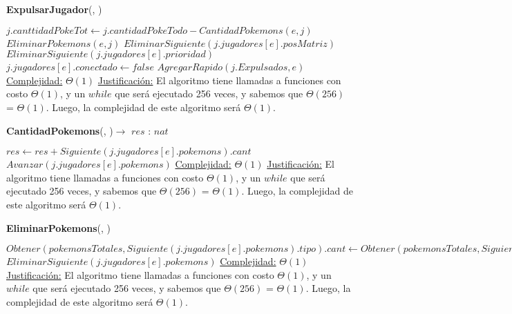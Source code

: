 \begin{algorithm}[H]{\textbf{ExpulsarJugador}(, )}   
    \begin{algorithmic}[1]
        \State $j.canttidadPokeTot \gets j.cantidadPokeTodo - CantidadPokemons(e,j)$
        \State $EliminarPokemons(e,j)$
        \State $EliminarSiguiente(j.jugadores[e].posMatriz)$
            \State $EliminarSiguiente(j.jugadores[e].prioridad)$
        \EndIf
        \State $j.jugadores[e].conectado \gets false$
        \State $AgregarRapido(j.Expulsados, e)$
        \medskip
        \Statex \underline{Complejidad:} $\Theta(1)$
        \Statex \underline{Justificación:}  El algoritmo tiene llamadas a funciones con costo $\Theta(1)$, y un $while$ que será ejecutado 256 veces, y sabemos que $\Theta (256)$ = $\Theta (1)$. Luego, la complejidad de este algoritmo será $\Theta (1)$.
    \end{algorithmic}
\end{algorithm} 

\begin{algorithm}[H]{\textbf{CantidadPokemons}(, )$\to$ $res$ : $nat$}   
    \begin{algorithmic}[1]
            \State $res \gets res + Siguiente(j.jugadores[e].pokemons).cant$
            \State $Avanzar(j.jugadores[e].pokemons)$
        \EndWhile
        \medskip
        \Statex \underline{Complejidad:} $\Theta(1)$
        \Statex \underline{Justificación:}  El algoritmo tiene llamadas a funciones con costo $\Theta(1)$, y un $while$ que será ejecutado 256 veces, y sabemos que $\Theta (256)$ = $\Theta (1)$. Luego, la complejidad de este algoritmo será $\Theta (1)$.
    \end{algorithmic}
\end{algorithm} 

\begin{algorithm}[H]{\textbf{EliminarPokemons}(, )}  
    \begin{algorithmic}[1]
            \State $Obtener(pokemonsTotales, Siguiente(j.jugadores[e].pokemons).tipo).cant \gets Obtener(pokemonsTotales, Siguiente(j.jugadores[e].pokemons).tipo).cant - Siguiente(j.jugadores[e].pokemons).cant$
            \State $EliminarSiguiente(j.jugadores[e].pokemons)$
        \EndWhile
        \medskip
        \Statex \underline{Complejidad:} $\Theta(1)$
        \Statex \underline{Justificación:}  El algoritmo tiene llamadas a funciones con costo $\Theta(1)$, y un $while$ que será ejecutado 256 veces, y sabemos que $\Theta (256)$ = $\Theta (1)$. Luego, la complejidad de este algoritmo será $\Theta (1)$.
    \end{algorithmic}
\end{algorithm} 

